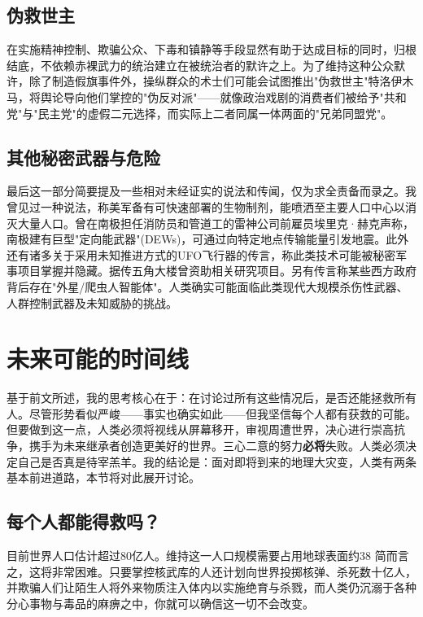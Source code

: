 \documentclass[10pt,twocolumn,letterpaper]{article}
\begin{document}
\subsection{伪救世主}
在实施精神控制、欺骗公众、下毒和镇静等手段显然有助于达成目标的同时，归根结底，不依赖赤裸武力的统治建立在被统治者的默许之上。为了维持这种公众默许，除了制造假旗事件外，操纵群众的术士们可能会试图推出"伪救世主"特洛伊木马，将舆论导向他们掌控的"伪反对派"——就像政治戏剧的消费者们被给予"共和党"与"民主党"的虚假二元选择，而实际上二者同属一体两面的"兄弟同盟党"。

\subsection{其他秘密武器与危险}
最后这一部分简要提及一些相对未经证实的说法和传闻，仅为求全责备而录之。我曾见过一种说法，称美军备有可快速部署的生物制剂，能喷洒至主要人口中心以消灭大量人口。曾在南极担任消防员和管道工的雷神公司前雇员埃里克·赫克声称，南极建有巨型"定向能武器"(DEWs)，可通过向特定地点传输能量引发地震\cite{43,44}。此外还有诸多关于采用未知推进方式的UFO飞行器的传言，称此类技术可能被秘密军事项目掌握并隐藏。据传五角大楼曾资助相关研究项目\cite{59}。另有传言称某些西方政府背后存在"外星/爬虫人智能体"\cite{58,55}。人类确实可能面临此类现代大规模杀伤性武器、人群控制武器及未知威胁的挑战。

\section{未来可能的时间线}

基于前文所述，我的思考核心在于：在讨论过所有这些情况后，是否还能拯救所有人。尽管形势看似严峻——事实也确实如此——但我坚信每个人都有获救的可能。但要做到这一点，人类必须将视线从屏幕移开，审视周遭世界，决心进行崇高抗争，携手为未来继承者创造更美好的世界。三心二意的努力\textbf{必将}失败。人类必须决定自己是否真是待宰羔羊。我的结论是：面对即将到来的地理大灾变，人类有两条基本前进道路，本节将对此展开讨论。
\subsection{每个人都能得救吗？}

目前世界人口估计超过80亿人\cite{47}。维持这一人口规模需要占用地球表面约38%
简而言之，这将非常困难。只要掌控核武库的人还计划向世界投掷核弹、杀死数十亿人，并欺骗人们让陌生人将外来物质注入体内以实施绝育与杀戮，而人类仍沉溺于各种分心事物与毒品的麻痹之中，你就可以确信这一切不会改变。
\end{document}

